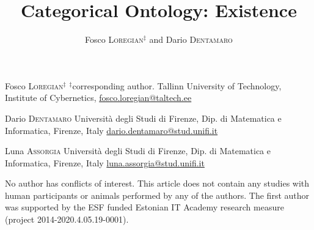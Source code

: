 \documentclass[a4paper,9pt]{../birkjour}
\title{Categorical Ontology: Existence}
\author{Fosco \textsc{Loregian}$^\ddag$ and Dario \textsc{Dentamaro}}
\begin{document}
\scriptsize

\maketitle

\begin{minipage}{.32\textwidth}
  Fosco \textsc{Loregian}$^\ddag$\newline
  $^\ddag$corresponding author. \newline
Tallinn University of Technology,\newline %
Institute of Cybernetics,\newline
\url{fosco.loregian@taltech.ee}
\end{minipage}\hfill %
\begin{minipage}{.32\textwidth}
  Dario \textsc{Dentamaro} \newline
  Università degli Studi di Firenze,\newline
  Dip. di Matematica e Informatica, \newline
  Firenze, Italy\newline
  \url{dario.dentamaro@stud.unifi.it}
\end{minipage}
\begin{minipage}{.32\textwidth}
  Luna \textsc{Assorgia} \newline
  Università degli Studi di Firenze,\newline
  Dip. di Matematica e Informatica, \newline
  Firenze, Italy\newline
  \url{luna.assorgia@stud.unifi.it}
\end{minipage}
\vspace*{\fill}%
\normalsize
No author has conflicts of interest. This article does not contain any studies with human participants or animals performed by any of the authors. The first author was supported by the ESF funded Estonian IT Academy research measure (project 2014-2020.4.05.19-0001).
\end{document}
